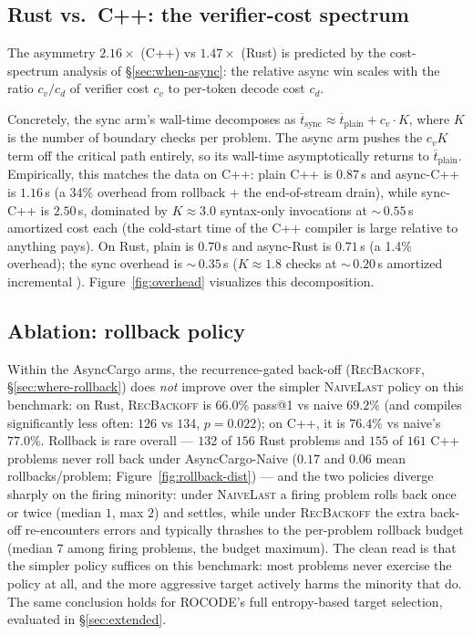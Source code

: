 \subsection{Rust vs.\ C++: the verifier-cost spectrum}\label{sec:headline-contrast}

The asymmetry $2.16\times$ (C++) vs $1.47\times$ (Rust) is
predicted by the cost-spectrum analysis of
\S\ref{sec:when-async}: the relative async win scales with the ratio
$c_v / c_d$ of verifier cost $c_v$ to per-token decode cost $c_d$.

Concretely, the sync arm's wall-time decomposes as
$\overline{t}_{\text{sync}} \approx
\overline{t}_{\text{plain}} + c_v \cdot K$, where $K$ is the number
of boundary checks per problem. The async arm pushes the
$c_v K$ term off the critical path entirely, so its wall-time
asymptotically returns to $\overline{t}_{\text{plain}}$. Empirically,
this matches the data on C++: plain C++ is $0.87$\,s and async-C++
is $1.16$\,s (a 34\% overhead from rollback + the end-of-stream
drain), while
sync-C++ is $2.50$\,s, dominated by $K \approx 3.0$ 
syntax-only invocations at $\sim$\,$0.55$\,s amortized cost each (the
cold-start time of the C++ compiler is large relative to anything
 pays). On Rust, plain is $0.70$\,s and async-Rust
is $0.71$\,s (a 1.4\% overhead); the sync overhead is
$\sim$\,$0.35$\,s ($K \approx 1.8$ checks at $\sim$\,$0.20$\,s
amortized incremental ). Figure~\ref{fig:overhead}
visualizes this decomposition.

\subsection{Ablation: rollback policy}\label{sec:results-ablation-policy}

Within the AsyncCargo arms, the recurrence-gated back-off
(\textsc{RecBackoff}, \S\ref{sec:where-rollback}) does
\emph{not} improve over the simpler \textsc{NaiveLast} policy on
this benchmark: on Rust, \textsc{RecBackoff} is $66.0\%$ pass@1 vs
naive
$69.2\%$ (and compiles significantly less often: $126$ vs $134$,
$p\!=\!0.022$); on
C++, it is $76.4\%$ vs naive's $77.0\%$. Rollback is rare overall
--- $132$ of $156$ Rust problems and $155$ of $161$ C++ problems
never roll back under AsyncCargo-Naive ($0.17$ and $0.06$ mean
rollbacks/problem; Figure~\ref{fig:rollback-dist}) --- and the two
policies diverge sharply on the firing minority: under
\textsc{NaiveLast} a firing problem rolls back once or twice
(median $1$, max $2$) and settles, while under \textsc{RecBackoff}
the extra back-off re-encounters errors and typically thrashes to
the per-problem rollback budget (median $7$ among firing problems,
the budget maximum). The clean read is that the simpler policy
suffices on this benchmark: most problems never exercise the
policy at all, and the more aggressive target actively harms the
minority that do. The same conclusion holds for ROCODE's full
entropy-based target selection, evaluated in
\S\ref{sec:extended}.

